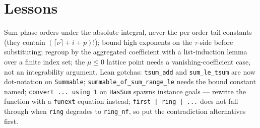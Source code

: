 \documentclass[11pt]{article}
\begin{document}
\section{Lessons}
Sum phase orders under the absolute integral, never the per-order tail constants (they contain
$(\lceil\nu\rceil+i+p)!$); bound high exponents on the $\tau$-side before substituting; regroup by the
aggregated coefficient with a list-induction lemma over a finite index set; the $\mu\le0$ lattice point
needs a vanishing-coefficient case, not an integrability argument. Lean gotchas: \texttt{tsum\_add} and
\texttt{sum\_le\_tsum} are now dot-notation on \texttt{Summable}; \texttt{summable\_of\_sum\_range\_le} needs
the bound constant named; \texttt{convert ... using 1} on \texttt{HasSum} spawns instance goals --- rewrite the
function with a \texttt{funext} equation instead; \texttt{first | ring | ...} does not fall through when
\texttt{ring} degrades to \texttt{ring\_nf}, so put the contradiction alternatives first.
\end{document}

